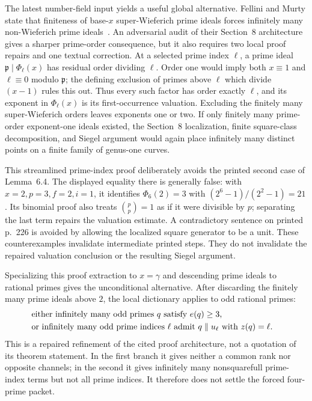 The latest number-field input yields a useful global alternative.  Fellini
and Murty state that finiteness of base-$x$ super-Wieferich prime ideals
forces infinitely many non-Wieferich prime ideals~\cite{FelliniMurty2026}.
An adversarial audit of their Section~8 architecture gives a sharper
prime-order consequence, but it also requires two local proof repairs and one
textual correction.  At a selected prime index $\ell$, a prime ideal
$\mathfrak p\mid\Phi_\ell(x)$ has residual order dividing $\ell$.  Order one
would imply both $x\equiv1$ and $\ell\equiv0$ modulo $\mathfrak p$; the
defining exclusion of primes above $\ell$ which divide $(x-1)$ rules this
out.  Thus every such factor has order exactly $\ell$, and its exponent in
$\Phi_\ell(x)$ is its first-occurrence valuation.  Excluding the finitely
many super-Wieferich orders leaves exponents one or two.  If only finitely
many prime-order exponent-one ideals existed, the Section~8 localization,
finite square-class decomposition, and Siegel argument would again place
infinitely many distinct points on a finite family of genus-one curves.

This streamlined prime-index proof deliberately avoids the printed second
case of Lemma~6.4.  The displayed equality there is generally false: with
$x=2,p=3,f=2,i=1$, it identifies $\Phi_6(2)=3$ with
$(2^6-1)/(2^2-1)=21$.  Its binomial proof also treats
$\binom pp=1$ as if it were divisible by $p$; separating the last term
repairs the valuation estimate.  A contradictory sentence on printed
p.~226 is avoided by allowing the localized square generator to be a unit.
These counterexamples invalidate intermediate printed steps.  They do not
invalidate the repaired valuation conclusion or the resulting Siegel
argument.

Specializing this proof extraction to $x=\gamma$ and descending prime ideals
to rational primes gives the unconditional alternative.  After discarding
the finitely many prime ideals above $2$, the local dictionary applies to odd
rational primes:
\begin{equation}\label{eq:gpsp-global-alternative}
\begin{split}
&\text{either infinitely many odd primes $q$ satisfy $e(q)\geq3$,}\cr
&\text{or infinitely many odd prime indices $\ell$ admit
  $q\parallel u_\ell$ with $z(q)=\ell$.}
\end{split}
\end{equation}
This is a repaired refinement of the cited proof architecture, not a
quotation of its theorem statement.  In the first branch it gives neither a common rank nor opposite
channels; in the second it gives infinitely many nonsquarefull prime-index
terms but not all prime indices.  It therefore does not settle the forced
four-prime packet.

